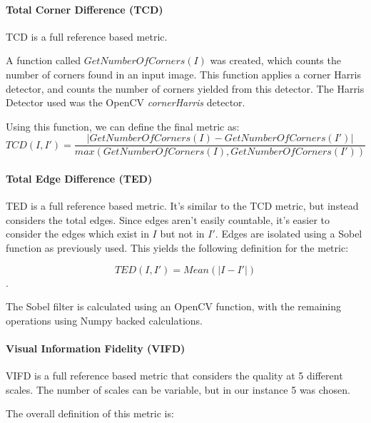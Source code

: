 \documentclass[11pt,a4paper]{article}
\begin{document}
            \paragraph{Total Corner Difference (TCD)}
                TCD is a full reference based metric. 
                
                A function called $GetNumberOfCorners(I)$ was created, which counts the number of corners found in an input image. This function applies a corner Harris detector,
                and counts the number of corners yielded from this detector. The Harris Detector used was the OpenCV \emph{cornerHarris} detector. 


                Using this function, we can define the final metric as: 
                $$TCD(I, I') = \frac{|GetNumberOfCorners(I) - GetNumberOfCorners(I')|}{max({GetNumberOfCorners(I), GetNumberOfCorners(I')})}$$

            \paragraph{Total Edge Difference (TED)}
                TED is a full reference based metric. It's similar to the TCD metric, but instead considers the total edges.
                Since edges aren't easily countable, it's easier to consider the edges which exist in $I$ but not in $I'$. 
                Edges are isolated using a Sobel function as previously used. This yields the following definition for the metric:

                $$TED(I, I') = Mean(|I - I'|)$$.

                The Sobel filter is calculated using an OpenCV function, with the remaining operations using Numpy backed calculations.

            \paragraph{Visual Information Fidelity (VIFD)}
                VIFD is a full reference based metric that considers the quality at 5 different scales. The number of scales can be variable, but in our instance 5 was chosen.

                The overall definition of this metric is:
\end{document}
